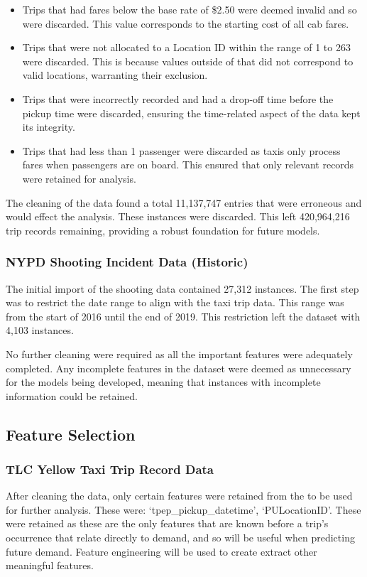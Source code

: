 \documentclass[11pt]{article}
\begin{document}
\begin{itemize} 
    \item Trips that had fares below the base rate of \$2.50 were deemed invalid and so were discarded. This value corresponds to the starting cost of all cab fares.
    \item Trips that were not allocated to a Location ID within the range of 1 to 263 were discarded. This is because values outside of that did not correspond to valid locations, warranting their exclusion. 
    \item Trips that were incorrectly recorded and had a drop-off time before the pickup time were discarded, ensuring the time-related aspect of the data kept its integrity.
    \item Trips that had less than 1 passenger were discarded as taxis only process fares when passengers are on board. This ensured that only relevant records were retained for analysis.  
\end{itemize} 

\hspace{0pt}The cleaning of the data found a total 11,137,747 entries that were erroneous and would effect the analysis. These instances were discarded. This left 420,964,216 trip records remaining, providing a robust foundation for future models.

\subsubsection{NYPD Shooting Incident Data (Historic)}
\hspace{0pt}The initial import of the shooting data contained 27,312 instances. The first step was to restrict the date range to align with the taxi trip data. This range was from the start of 2016 until the end of 2019. This restriction left the dataset with 4,103 instances. 

No further cleaning were required as all the important features were adequately completed. Any incomplete features in the dataset were deemed as unnecessary for the models being developed, meaning that instances with incomplete information could be retained.

\subsection{Feature Selection}
\subsubsection{TLC Yellow Taxi Trip Record Data}
\hspace{0pt}After cleaning the data, only certain features were retained from the to be used for further analysis. These were: ‘tpep\_pickup\_datetime’, ‘PULocationID’. These were retained as these are the only features that are known before a trip's occurrence that relate directly to demand, and so will be useful when predicting future demand. Feature engineering will be used to create extract other meaningful features.
\end{document}
